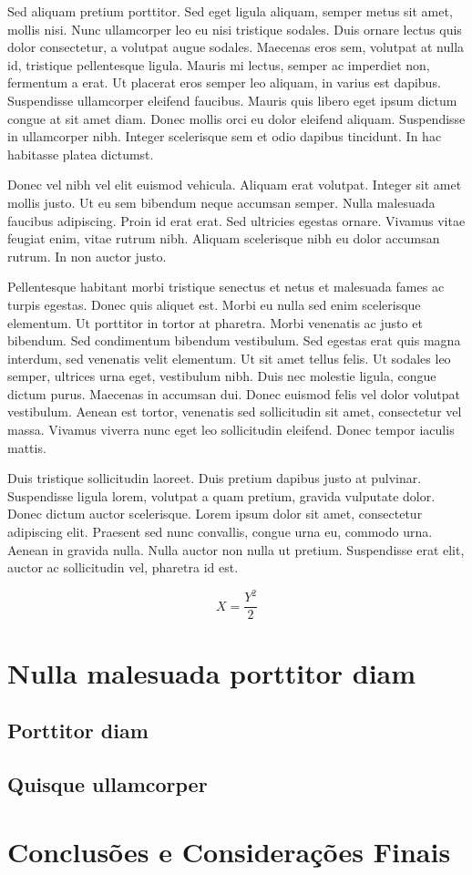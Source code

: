 \documentclass[12pt,oneside,a4paper]{article}			%
\begin{document}
Sed aliquam pretium porttitor. Sed eget ligula aliquam, semper metus sit amet, mollis nisi\cite{article-minimal}. Nunc ullamcorper leo eu nisi tristique sodales. Duis ornare lectus quis dolor consectetur, a volutpat augue sodales. Maecenas eros sem, volutpat at nulla id, tristique pellentesque ligula. Mauris mi lectus, semper ac imperdiet non, fermentum a erat. Ut placerat eros semper leo aliquam, in varius est dapibus. Suspendisse ullamcorper eleifend faucibus. Mauris quis libero eget ipsum dictum congue at sit amet diam. Donec mollis orci eu dolor eleifend aliquam. Suspendisse in ullamcorper nibh. Integer scelerisque sem et odio dapibus tincidunt. In hac habitasse platea dictumst\cite{booklet-full}.


Donec vel nibh vel elit euismod vehicula. Aliquam erat volutpat. Integer sit amet mollis justo. Ut eu sem bibendum neque accumsan semper. Nulla malesuada faucibus adipiscing. Proin id erat erat. Sed ultricies egestas ornare. Vivamus vitae feugiat enim, vitae rutrum nibh. Aliquam scelerisque nibh eu dolor accumsan rutrum. In non auctor justo\cite{article-minimal}.

Pellentesque habitant morbi tristique senectus et netus et malesuada fames ac turpis egestas. Donec quis aliquet est. Morbi eu nulla sed enim scelerisque elementum. Ut porttitor in tortor at pharetra. Morbi venenatis ac justo et bibendum. Sed condimentum bibendum vestibulum. Sed egestas erat quis magna interdum, sed venenatis velit elementum. Ut sit amet tellus felis. Ut sodales leo semper, ultrices urna eget, vestibulum nibh. Duis nec molestie ligula, congue dictum purus. Maecenas in accumsan dui. Donec euismod felis vel dolor volutpat vestibulum. Aenean est tortor, venenatis sed sollicitudin sit amet, consectetur vel massa. Vivamus viverra nunc eget leo sollicitudin eleifend. Donec tempor iaculis mattis\cite{misc-full}.

Duis tristique sollicitudin laoreet. Duis pretium dapibus justo at pulvinar. Suspendisse ligula lorem, volutpat a quam pretium, gravida vulputate dolor. Donec dictum auctor scelerisque. Lorem ipsum dolor sit amet, consectetur adipiscing elit. Praesent sed nunc convallis, congue urna eu, commodo urna. Aenean in gravida nulla. Nulla auctor non nulla ut pretium. Suspendisse erat elit, auctor ac sollicitudin vel, pharetra id est.

\begin{equation}
X = \frac{Y^2}{2}
\end{equation}




\section{Nulla malesuada porttitor diam}
\lipsum[3-6]
\subsection{Porttitor diam}
\lipsum[10-15]
\subsection{Quisque ullamcorper}
\lipsum[18-20]
\section{Conclusões e Considerações Finais}
\lipsum[25-28]



\end{document}
